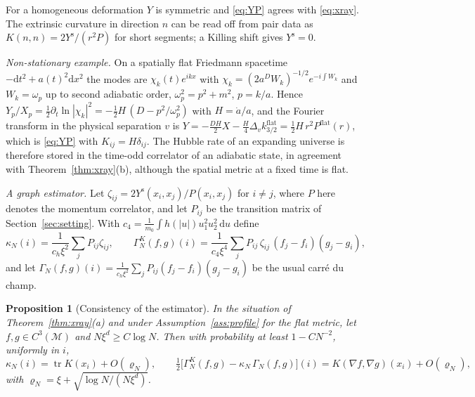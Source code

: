 \documentclass[11pt,a4paper]{article}
\theoremstyle{stmt}
\newtheorem{proposition}[theorem]{Proposition}
\theoremstyle{defn}
\theoremstyle{rmk}
\numberwithin{equation}{section}
\newcommand{\M}{\mathcal{M}}
\newcommand{\dd}{\mathrm{d}}
\begin{document}
For a homogeneous deformation $Y$ is symmetric and \eqref{eq:YP} agrees with \eqref{eq:xray}. The extrinsic curvature in direction $n$ can be read off from pair data as $K(n,n)=2Y^{\mathrm s}/(r^2P)$ for short segments; a Killing shift gives $Y^{\mathrm s}=0$.

\emph{Non-stationary example.} On a spatially flat Friedmann spacetime $-\dd t^2+a(t)^2\dd x^2$ the modes are $\chi_k(t)e^{ikx}$ with $\chi_k=(2a^DW_k)^{-1/2}e^{-i\int W_k}$ and $W_k=\omega_p$ up to second adiabatic order, $\omega_p^2=p^2+m^2$, $p=k/a$. Hence $Y_p/X_p=\tfrac12\partial_t\ln|\chi_k|^2=-\tfrac12H\,(D-p^2/\omega_p^2)$ with $H=\dot a/a$, and the Fourier transform in the physical separation $v$ is $Y=-\tfrac{DH}{2}X-\tfrac H4\Delta_vk^{\mathrm{flat}}_{3/2}=\tfrac12H\,r^2P^{\mathrm{flat}}(r)$, which is \eqref{eq:YP} with $K_{ij}=H\delta_{ij}$. The Hubble rate of an expanding universe is therefore stored in the time-odd correlator of an adiabatic state, in agreement with Theorem~\ref{thm:xray}(b), although the spatial metric at a fixed time is flat.

\emph{A graph estimator.} Let $\zeta_{ij}=2Y^{\mathrm s}(x_i,x_j)/P(x_i,x_j)$ for $i\ne j$, where $P$ here denotes the momentum correlator, and let $P_{ij}$ be the transition matrix of Section~\ref{sec:setting}. With $c_4=\tfrac1{m_0}\int h(|u|)u_1^2u_2^2\,\dd u$ define
\begin{equation}
\kappa_N(i)=\frac{1}{c_h\xi^2}\sum_jP_{ij}\zeta_{ij},\qquad
\Gamma^K_N(f,g)(i)=\frac{1}{c_4\xi^4}\sum_jP_{ij}\,\zeta_{ij}\,(f_j-f_i)(g_j-g_i),
\end{equation}
and let $\Gamma_N(f,g)(i)=\frac{1}{c_h\xi^2}\sum_jP_{ij}(f_j-f_i)(g_j-g_i)$ be the usual carr\'e du champ.

\begin{proposition}[Consistency of the estimator]\label{prop:Kgraph}
In the situation of Theorem~\ref{thm:xray}(a) and under Assumption~\ref{ass:profile} for the flat metric, let $f,g\in C^3(\M)$ and $N\xi^{d}\ge C\log N$. Then with probability at least $1-CN^{-2}$, uniformly in $i$,
\begin{equation}
\kappa_N(i)=\operatorname{tr}K(x_i)+O(\varrho_N),\qquad
\tfrac12\big[\Gamma^K_N(f,g)-\kappa_N\,\Gamma_N(f,g)\big](i)=K(\nabla f,\nabla g)(x_i)+O(\varrho_N),
\end{equation}
with $\varrho_N=\xi+\sqrt{\log N/(N\xi^d)}$.
\end{proposition}
\end{document}
